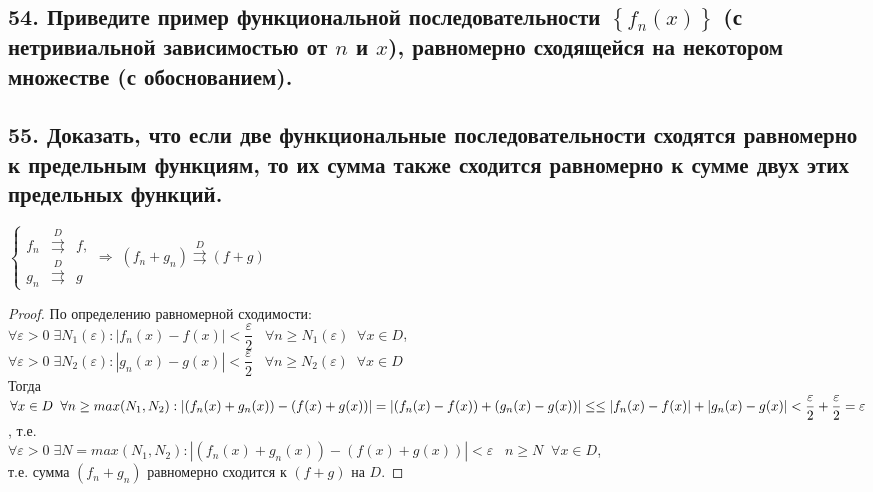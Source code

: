 \documentclass[a4paper, fleqn]{article}
\begin{document}
    \subsection*{54. Приведите пример функциональной последовательности $\left\{f_n(x)\right\}$ (с нетривиальной зависимостью от $n$ и $x$), равномерно сходящейся на некотором множестве (с обоснованием).}
    \begin{example}
        \begin{flalign*}
            &f_n(x) = , \hspace{1cm} D = \left[ 0; +\infty \right) \\
            &f_n(x) \overset{D}{\rightrightarrows} 0 \\
            & \norm{f_n - 0} = \norm{f_n} = \sup_{x \in D} \left| f_n(x) \right| = \frac{1}{n} \to 0 \\
            & \implies \text{ последовательность сходится равномерно.}
        \end{flalign*}
    \end{example}
        
    \subsection*{55. Доказать, что если две функциональные последовательности сходятся равномерно к предельным функциям, 
    то их сумма также сходится равномерно к сумме двух этих предельных функций.}
	$\left\{\begin{array}{lll} 
	f_n &\overset{D}{\rightrightarrows}& f, \\[5 pt]
	g_n && g
	\end{array}\right. \Rightarrow \; (f_n + g_n) \overset{D}{\rightrightarrows} (f + g)$
	\begin{proof}
	По определению равномерной сходимости: \\[3 pt]
	$\forall \varepsilon > 0 \; \exists N_1(\varepsilon) : |f_n(x) - f(x)| < \dfrac{\varepsilon}2 \;\;\; \forall n \ge N_1(\varepsilon)\;\; \forall x \in D$, \\[3 pt]
	$\forall \varepsilon > 0 \; \exists N_2(\varepsilon) : |g_n(x) - g(x)| < \dfrac{\varepsilon}2 \;\;\; \forall n \ge N_2(\varepsilon)\;\; \forall x \in D$ \\[3 pt]
	Тогда \\[3 pt]
	$\forall x \in D \;\; \forall n \ge max(N_1, N_2) : |(f_n(x) + g_n(x)) - (f(x) + g(x))|  = |(f_n(x) - f(x)) + (g_n(x) - g(x))|  \le \\[3 pt]
	\le |f_n(x) - f(x)| + |g_n(x) - g(x)| < \dfrac{\varepsilon}2 + \dfrac{\varepsilon}2 = \varepsilon$, т.е. \\[3 pt]
	$\forall \varepsilon > 0 \; \exists N = max(N_1, N_2) : |(f_n(x) + g_n(x)) - (f(x) + g(x))| < \varepsilon \;\;\; n \ge N \;\; \forall x \in D$, \\[5 pt]
	т.е. сумма $(f_n + g_n)$ равномерно сходится к $(f + g)$ на $D$.
	\end{proof} 
  
\end{document}
